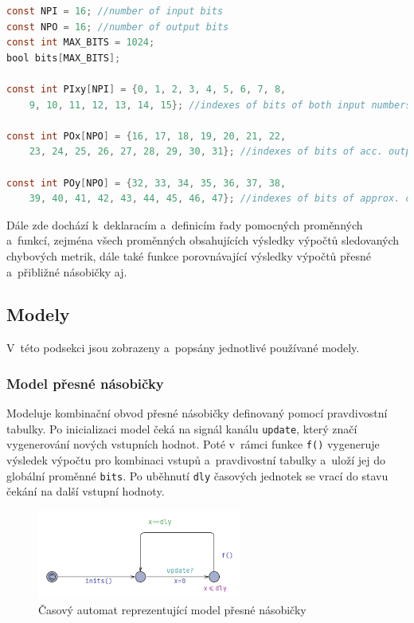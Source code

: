 \begin{lstlisting}[language={C}, caption={Základní rozhraní systému}, label={lst:interface}]
const NPI = 16; //number of input bits
const NPO = 16; //number of output bits
const int MAX_BITS = 1024;
bool bits[MAX_BITS];

const int PIxy[NPI] = {0, 1, 2, 3, 4, 5, 6, 7, 8,
    9, 10, 11, 12, 13, 14, 15}; //indexes of bits of both input numbers

const int POx[NPO] = {16, 17, 18, 19, 20, 21, 22,
    23, 24, 25, 26, 27, 28, 29, 30, 31}; //indexes of bits of acc. output

const int POy[NPO] = {32, 33, 34, 35, 36, 37, 38,
    39, 40, 41, 42, 43, 44, 45, 46, 47}; //indexes of bits of approx. output
\end{lstlisting}

Dále zde dochází k~deklaracím a~definicím řady pomocných proměnných a~funkcí, zejména všech proměnných obsahujících výsledky výpočtů sledovaných chybových metrik, dále také funkce porovnávající výsledky výpočtů přesné a~přibližné násobičky aj.

\subsection{Modely}
V~této podsekci jsou zobrazeny a~popsány jednotlivé používané modely.

\subsubsection{Model přesné násobičky}
Modeluje kombinační obvod přesné násobičky definovaný pomocí pravdivostní tabulky. Po inicializaci model čeká na signál kanálu \texttt{update}, který značí vygenerování nových vstupních hodnot. Poté v~rámci funkce \texttt{f()} vygeneruje výsledek výpočtu pro kombinaci vstupů a~pravdivostní tabulky a~uloží jej do globální proměnné \texttt{bits}. Po uběhnutí \texttt{dly} časových jednotek se vrací do stavu čekání na další vstupní hodnoty.

\begin{figure}[H]
    \centering
    \includegraphics[width=0.6\textwidth]{obrazky-figures/model_tmul2any.png}
    \caption{Časový automat reprezentující model přesné násobičky}
    \label{fig:model_tmul2any}
\end{figure}

